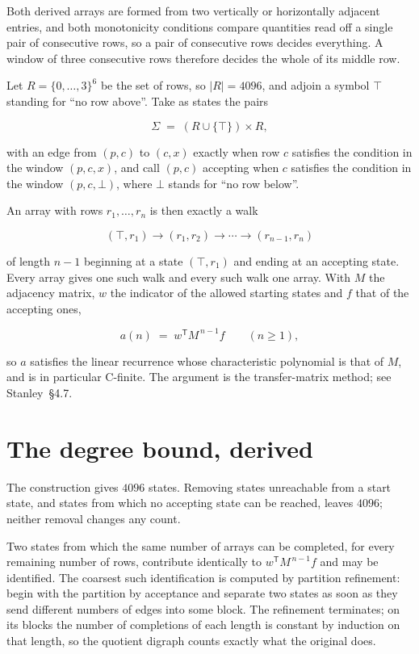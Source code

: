 \documentclass[11pt]{article}
\theoremstyle{definition}
\begin{document}
Both derived arrays are formed from two vertically or horizontally adjacent entries, and both monotonicity conditions compare quantities read off a single pair of consecutive rows, so a pair of consecutive rows decides everything. A window of three consecutive rows therefore decides the whole of its middle row.

Let $R = \{0,\dots,3\}^{6}$ be the set of rows, so $|R| = 4096$, and adjoin a symbol $\top$ standing for ``no row above''. Take as states the pairs

\[\Sigma \;=\; (R \cup \{\top\}) \times R,\]

with an edge from $(p,c)$ to $(c,x)$ exactly when row $c$ satisfies the condition in the window $(p,c,x)$, and call $(p,c)$ accepting when $c$ satisfies the condition in the window $(p,c,\bot)$, where $\bot$ stands for ``no row below''.

An array with rows $r_1,\dots,r_n$ is then exactly a walk

\[(\top,r_1) \to (r_1,r_2) \to \cdots \to (r_{n-1},r_n)\]

of length $n-1$ beginning at a state $(\top,r_1)$ and ending at an accepting state. Every array gives one such walk and every such walk one array. With $M$ the adjacency matrix, $w$ the indicator of the allowed starting states and $f$ that of the accepting ones,

\[a(n) \;=\; w^{\mathsf T} M^{\,n-1} f \qquad (n \ge 1),\]

so $a$ satisfies the linear recurrence whose characteristic polynomial is that of $M$, and is in particular C-finite. The argument is the transfer-matrix method; see Stanley~\S4.7.

\section{The degree bound, derived}

The construction gives $4096$ states. Removing states unreachable from a start state, and states from which no accepting state can be reached, leaves $4096$; neither removal changes any count.

Two states from which the same number of arrays can be completed, for every remaining number of rows, contribute identically to $w^{\mathsf T}M^{\,n-1}f$ and may be identified. The coarsest such identification is computed by partition refinement: begin with the partition by acceptance and separate two states as soon as they send different numbers of edges into some block. The refinement terminates; on its blocks the number of completions of each length is constant by induction on that length, so the quotient digraph counts exactly what the original does.
\end{document}
